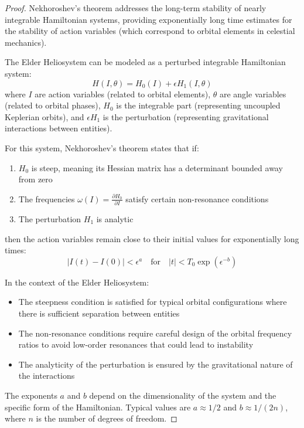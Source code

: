 \begin{proof}
Nekhoroshev's theorem addresses the long-term stability of nearly integrable Hamiltonian systems, providing exponentially long time estimates for the stability of action variables (which correspond to orbital elements in celestial mechanics).

The Elder Heliosystem can be modeled as a perturbed integrable Hamiltonian system:
\begin{equation}
H(I, \theta) = H_0(I) + \epsilon H_1(I, \theta)
\end{equation}
where $I$ are action variables (related to orbital elements), $\theta$ are angle variables (related to orbital phases), $H_0$ is the integrable part (representing uncoupled Keplerian orbits), and $\epsilon H_1$ is the perturbation (representing gravitational interactions between entities).

For this system, Nekhoroshev's theorem states that if:
\begin{enumerate}
    \item $H_0$ is steep, meaning its Hessian matrix has a determinant bounded away from zero
    \item The frequencies $\omega(I) = \frac{\partial H_0}{\partial I}$ satisfy certain non-resonance conditions
    \item The perturbation $H_1$ is analytic
\end{enumerate}
then the action variables remain close to their initial values for exponentially long times:
\begin{equation}
|I(t) - I(0)| < \epsilon^a \quad \text{for} \quad |t| < T_0 \exp(\epsilon^{-b})
\end{equation}

In the context of the Elder Heliosystem:
\begin{itemize}
    \item The steepness condition is satisfied for typical orbital configurations where there is sufficient separation between entities
    \item The non-resonance conditions require careful design of the orbital frequency ratios to avoid low-order resonances that could lead to instability
    \item The analyticity of the perturbation is ensured by the gravitational nature of the interactions
\end{itemize}

The exponents $a$ and $b$ depend on the dimensionality of the system and the specific form of the Hamiltonian. Typical values are $a \approx 1/2$ and $b \approx 1/(2n)$, where $n$ is the number of degrees of freedom.


\end{proof}
